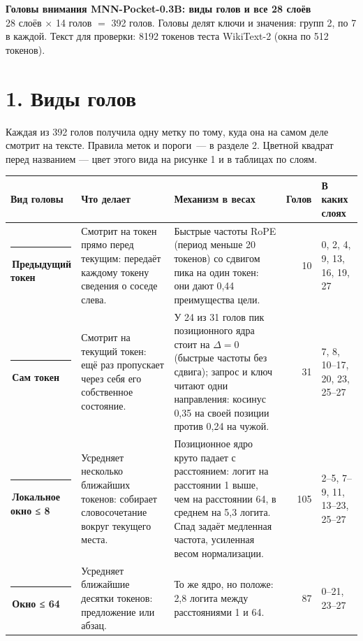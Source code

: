 \documentclass[10pt]{article}
\begin{document}
{\LARGE\bfseries Головы внимания MNN-Pocket-0.3B: виды голов и все 28 слоёв}\\[0.2em]
{\color{ink2} 28 слоёв $\times$ 14 голов $=$ 392 голов. Головы делят ключи и значения: групп 2, по 7 в каждой. Текст для проверки: 8192 токенов теста WikiText-2 (окна по 512 токенов).}

\section*{1. Виды голов}
Каждая из 392 голов получила одну метку по тому, куда она на самом деле смотрит на тексте. Правила меток и пороги~— в разделе 2. Цветной квадрат перед названием — цвет этого вида на рисунке 1 и в таблицах по слоям.
\begin{center}{\small\begin{tabular}{|p{4.3cm}|p{8.9cm}|p{7.3cm}|r|p{3.0cm}|}
\hline
\rowcolor{head}\textbf{Вид головы} & \textbf{Что делает} & \textbf{Механизм в весах} & \textbf{Голов} & \textbf{В каких слоях} \\ \hline
\textcolor[HTML]{2A78D6}{\rule{0.62em}{0.62em}}\,\textbf{Предыдущий токен} & Смотрит на токен прямо перед текущим: передаёт каждому токену сведения о соседе слева. & Быстрые частоты RoPE (период меньше 20 токенов) со сдвигом пика на один токен: они дают 0,44 преимущества цели. & 10 & 0, 2, 4, 9, 13, 16, 19, 27 \\ \hline
\textcolor[HTML]{2A78D6}{\rule{0.62em}{0.62em}}\,\textbf{Сам токен} & Смотрит на текущий токен: ещё раз пропускает через себя его собственное состояние. & У 24 из 31 голов пик позиционного ядра стоит на $\Delta{=}0$ (быстрые частоты без сдвига); запрос и ключ читают одни направления: косинус 0,35 на своей позиции против 0,24 на чужой. & 31 & 7, 8, \mbox{10–17}, 20, 23, \mbox{25–27} \\ \hline
\textcolor[HTML]{1BAF7A}{\rule{0.62em}{0.62em}}\,\textbf{Локальное окно ≤ 8} & Усредняет несколько ближайших токенов: собирает словосочетание вокруг текущего места. & Позиционное ядро круто падает с расстоянием: логит на расстоянии 1 выше, чем на расстоянии 64, в среднем на 5,3 логита. Спад задаёт медленная частота, усиленная весом нормализации. & 105 & \mbox{2–5}, \mbox{7–9}, 11, \mbox{13–23}, \mbox{25–27} \\ \hline
\textcolor[HTML]{EDA100}{\rule{0.62em}{0.62em}}\,\textbf{Окно ≤ 64} & Усредняет ближайшие десятки токенов: предложение или абзац. & То же ядро, но положе: 2,8 логита между расстояниями 1 и 64. & 87 & \mbox{0–21}, \mbox{23–27} \\ \hline

\end{tabular}}
\end{center}
\end{document}
